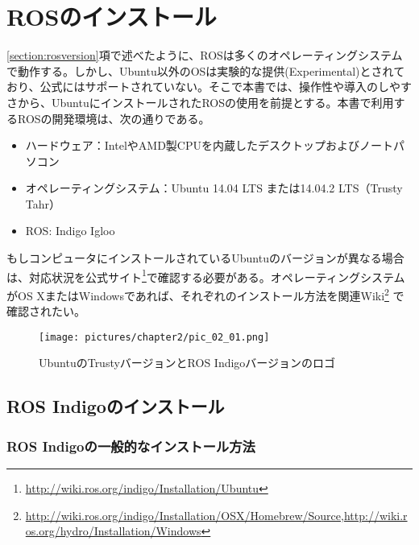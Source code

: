 
\chapter{ROSのインストール}

\ref{section:rosversion}項で述べたように、ROSは多くのオペレーティングシステムで動作する。しかし、Ubuntu以外のOSは実験的な提供(Experimental)とされており、公式にはサポートされていない。そこで本書では、操作性や導入のしやすさから、UbuntuにインストールされたROSの使用を前提とする。本書で利用するROSの開発環境は、次の通りである。
\\
\begin{itemize}
\item ハードウェア：IntelやAMD製CPUを内蔵したデスクトップおよびノートパソコン
\item オペレーティングシステム：Ubuntu 14.04 LTS または14.04.2 LTS（Trusty Tahr）
\item ROS: Indigo Igloo
\end{itemize}
\vspace{1\baselineskip}
もしコンピュータにインストールされているUbuntuのバージョンが異なる場合は、対応状況を公式サイト\footnote{\url{http://wiki.ros.org/indigo/Installation/Ubuntu}}で確認する必要がある。オペレーティングシステムがOS XまたはWindowsであれば、それぞれのインストール方法を関連Wiki\footnote{\url{http://wiki.ros.org/indigo/Installation/OSX/Homebrew/Source},\url{http://wiki.ros.org/hydro/Installation/Windows}} で確認されたい。

\begin{figure}[h]
  \centering
  \texttt{[image: pictures/chapter2/pic\_02\_01.png]}
  \caption{UbuntuのTrustyバージョンとROS Indigoバージョンのロゴ}
\end{figure}

\section{ROS Indigoのインストール}

\subsection{ROS Indigoの一般的なインストール方法}
\label{section:rosinstall}

